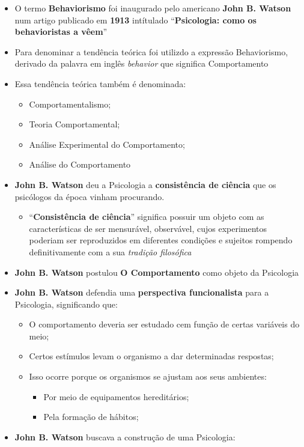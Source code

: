 \documentclass[
]{book}
\providecommand{\tightlist}{%
  \setlength{\itemsep}{0pt}\setlength{\parskip}{0pt}}
\begin{document}
\begin{itemize}
\tightlist
\item
  O termo \textbf{Behaviorismo} foi inaugurado pelo americano \textbf{John B. Watson} num artigo publicado em \textbf{1913} intítulado ``\textbf{Psicologia: como os behavioristas a vêem}''
\item
  Para denominar a tendência teórica foi utilizdo a expressão Behaviorismo, derivado da palavra em inglês \emph{behavior} que significa Comportamento
\item
  Essa tendência teórica também é denominada:

  \begin{itemize}
  \tightlist
  \item
    Comportamentalismo;
  \item
    Teoria Comportamental;
  \item
    Análise Experimental do Comportamento;
  \item
    Análise do Comportamento
  \end{itemize}
\item
  \textbf{John B. Watson} deu a Psicologia a \textbf{consistência de ciência} que os psicólogos da época vinham procurando.

  \begin{itemize}
  \tightlist
  \item
    ``\textbf{Consistência de ciência}'' significa possuir um objeto com as características de ser mensurável, observável, cujos experimentos poderiam ser reproduzidos em diferentes condições e sujeitos rompendo definitivamente com a sua \emph{tradição filosófica}
  \end{itemize}
\item
  \textbf{John B. Watson} postulou \textbf{O Comportamento} como objeto da Psicologia
\item
  \textbf{John B. Watson} defendia uma \textbf{perspectiva funcionalista} para a Psicologia, significando que:

  \begin{itemize}
  \tightlist
  \item
    O comportamento deveria ser estudado cem função de certas variáveis do meio;
  \item
    Certos estímulos levam o organismo a dar determinadas respostas;
  \item
    Isso ocorre porque os organismos se ajustam aos seus ambientes:

    \begin{itemize}
    \tightlist
    \item
      Por meio de equipamentos hereditários;
    \item
      Pela formação de hábitos;
    \end{itemize}
  \end{itemize}
\item
  \textbf{John B. Watson} buscava a construção de uma Psicologia:


\end{itemize}
\end{document}

